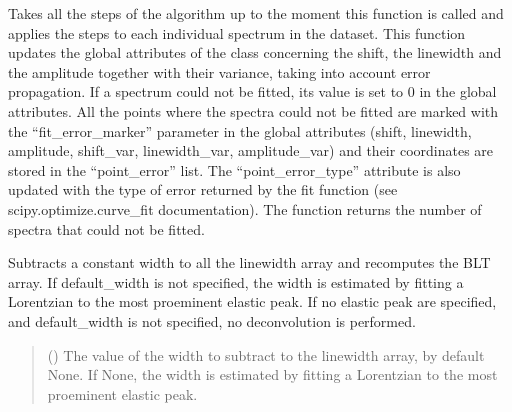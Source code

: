 \documentclass[letterpaper,10pt,english]{sphinxmanual}
\begin{document}
\begin{fulllineitems}
\begin{fulllineitems}
\end{fulllineitems}


\begin{fulllineitems}
\label{\detokenize{source/_autosummary/HDF5_BLS_treat.Treat:HDF5_BLS_treat.Treat.apply_algorithm_on_all}}
\pysigstartsignatures
\pysiglinewithargsret
{}
{}
{}
\pysigstopsignatures
\sphinxAtStartPar
Takes all the steps of the algorithm up to the moment this function is called and applies the steps to each individual spectrum in the dataset.
This function updates the global attributes of the class concerning the shift, the linewidth and the amplitude together with their variance, taking into account error propagation.
If a spectrum could not be fitted, its value is set to 0 in the global attributes.
All the points where the spectra could not be fitted are marked with the “fit\_error\_marker” parameter in the global attributes (shift, linewidth, amplitude, shift\_var, linewidth\_var, amplitude\_var) and their coordinates are stored in the “point\_error” list. The “point\_error\_type” attribute is also updated with the type of error returned by the fit function (see scipy.optimize.curve\_fit documentation). The function returns the number of spectra that could not be fitted.

\end{fulllineitems}


\begin{fulllineitems}
\label{\detokenize{source/_autosummary/HDF5_BLS_treat.Treat:HDF5_BLS_treat.Treat.blind_deconvolution}}
\pysigstartsignatures
\pysiglinewithargsret
{}
{}
{}
\pysigstopsignatures
\sphinxAtStartPar
Subtracts a constant width to all the linewidth array and recomputes the BLT array. If default\_width is not specified, the width is estimated by fitting a Lorentzian to the most proeminent elastic peak. If no elastic peak are specified, and default\_width is not specified, no deconvolution is performed.
\begin{quote}\begin{description}
\sphinxAtStartPar
{} (\sphinxstyleliteralemphasis{\sphinxupquote{, }}) \textendash{} The value of the width to subtract to the linewidth array, by default None. If None, the width is estimated by fitting a Lorentzian to the most proeminent elastic peak.


\end{description}
\end{quote}
\end{fulllineitems}
\end{fulllineitems}
\end{document}
